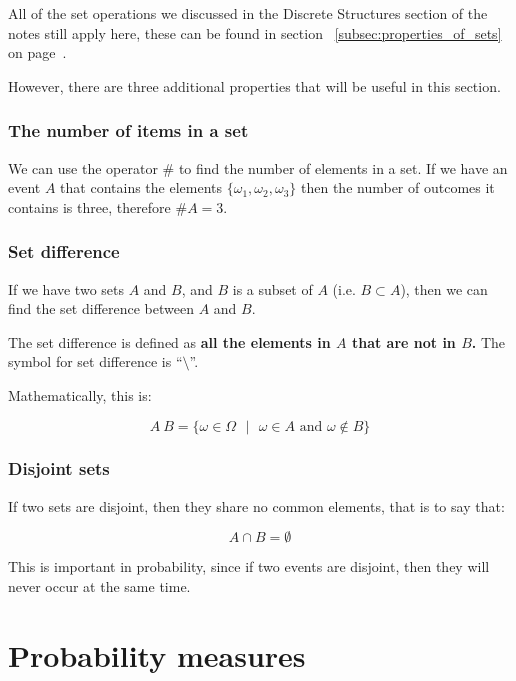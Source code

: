 All of the set operations we discussed in the Discrete Structures section of the
notes still apply here, these can be found in section
~\ref{subsec:properties_of_sets} on page~\pageref{subsec:properties_of_sets}.

However, there are three additional properties that will be useful in this
section.

\subsubsection{The number of items in a set}

We can use the operator $\#$ to find the number of elements in a set. If we have
an event $A$ that contains the elements $\{\omega_1, \omega_2, \omega_3\}$ then
the number of outcomes it contains is three, therefore $\#A = 3$.

\subsubsection{Set difference}

If we have two sets $A$ and $B$, and $B$ is a subset of $A$ (i.e. $B \subset
A$), then we can find the set difference between $A$ and $B$.

The set difference is defined as {\bf all the elements in $A$ that are not in
$B$.} The symbol for set difference is ``$\setminus$''.

Mathematically, this is:

\begin{dmath}
	{A \ B = \{\omega \in \Omega \textrm{ } \vert \textrm{ } \omega \in A \textrm{ and } \omega \not\in B\}}
\end{dmath}

\subsubsection{Disjoint sets}

If two sets are disjoint, then they share no common elements, that is to say
that:

\begin{dmath}
	A \cap B = \emptyset
\end{dmath}

This is important in probability, since if two events are disjoint, then they
will never occur at the same time.

\section{Probability measures}

